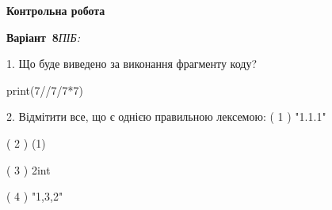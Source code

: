 \documentclass[11pt]{article}
\begin{document}
{\large\textbf{Контрольна робота}}

\textbf{Варіант \No\,8}\hfill \textit{ПІБ:}\,\underline{\hspace{60mm}}
\vspace{4mm}

1. Що буде виведено за виконання фрагменту коду?

print(7//7/7*7)


2. %
Відмітити все, що є однією правильною лексемою:
( 1 ) "1.1.1"

( 2 ) (1)

( 3 ) 2int

( 4 ) "1,3,2"


\newpage
\end{document}
